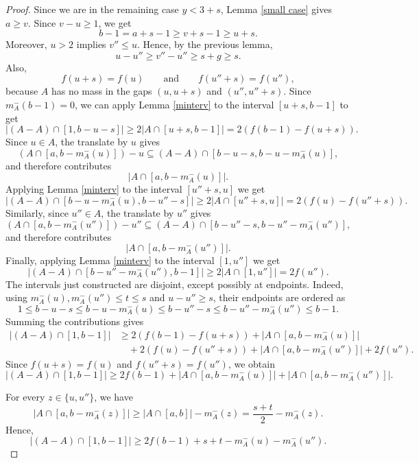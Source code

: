 \documentclass[11pt,reqno]{amsart}
\theoremstyle{definition}
\def\F#1{f(#1)}
\begin{document}
\begin{proof}
     Since we are in the remaining case $y<3+s$, Lemma \ref{small case} gives $a\geq v$. Since $v-u\geq1$, we get
    $$
        b-1=a+s-1\geq v+s-1\geq u+s.
    $$
    Moreover, $u>2$ implies $v''\leq u$. Hence, by the previous lemma,
    $$
        u-u''\geq v''-u''\geq s+g\geq s.
    $$
    Also,
    $$
        \F{u+s}=\F{u}
        \qquad\text{and}\qquad
        \F{u''+s}=\F{u''},
    $$
    because $A$ has no mass in the gaps $(u,u+s)$ and $(u'',u''+s)$.
Since $m_A^-(b-1)=0$, we can apply Lemma \ref{minterv}
to the interval $[u+s,b-1]$ to get
$$
    |(A-A)\cap[1,b-u-s]|
    \geq 2|A\cap[u+s,b-1]|
    =
    2(\F{b-1}-\F{u+s}).
$$
Since $u\in A$, the translate by $u$ gives
    $$
        (A\cap[a,b-m_A^-(u)])-u
        \subseteq
        (A-A)\cap[b-u-s,b-u-m_A^-(u)],
    $$
    and therefore contributes
    $$
        |A\cap[a,b-m_A^-(u)]|.
    $$
    Applying Lemma \ref{minterv} to the interval $[u''+s,u]$ we get
$$
    |(A-A)\cap[b-u-m_A^-(u),b-u''-s]|
    \geq 2|A\cap[u''+s,u]|
    =
    2(\F{u}-\F{u''+s}).
$$
Similarly, since $u''\in A$, the translate by $u''$ gives
    $$
        (A\cap[a,b-m_A^-(u'')])-u''
        \subseteq
        (A-A)\cap[b-u''-s,b-u''-m_A^-(u'')],
    $$
    and therefore contributes
    $$
        |A\cap[a,b-m_A^-(u'')]|.
    $$
        Finally, applying Lemma \ref{minterv} to the interval $[1,u'']$ we get
    $$
        |(A-A)\cap[b-u''-m_A^-(u''),b-1]|
        \geq 2|A\cap[1,u'']|
        =
        2\F{u''}.
    $$
    The intervals just constructed are disjoint, except possibly at endpoints. Indeed, using
    $m_A^-(u),m_A^-(u'')\leq t\leq s$ and $u-u''\geq s$, their endpoints are ordered as
    $$
        1\leq b-u-s\leq b-u-m_A^-(u)
        \leq b-u''-s\leq b-u''-m_A^-(u'')\leq b-1.
    $$
    Summing the contributions gives
    \begin{align*}
        |(A-A)\cap[1,b-1]|
        &\geq
        2(\F{b-1}-\F{u+s})
        + |A\cap[a,b-m_A^-(u)]|\\
        &\quad
        +2(\F{u}-\F{u''+s})
        + |A\cap[a,b-m_A^-(u'')]|
        +2\F{u''}.
    \end{align*}
    Since $\F{u+s}=\F{u}$ and $\F{u''+s}=\F{u''}$, we obtain
    $$
        |(A-A)\cap[1,b-1]|
        \geq
        2\F{b-1}
        + |A\cap[a,b-m_A^-(u)]|
        + |A\cap[a,b-m_A^-(u'')]|.
    $$

    For every $z\in\{u,u''\}$, we have
    $$
        |A\cap[a,b-m_A^-(z)]|
        \geq
        |A\cap[a,b]|-m_A^-(z)
        =
        \frac{s+t}{2}-m_A^-(z).
    $$
    Hence,
    $$
        |(A-A)\cap[1,b-1]|
        \geq
        2\F{b-1}+s+t-m_A^-(u)-m_A^-(u'').
    $$


\end{proof}
\end{document}
